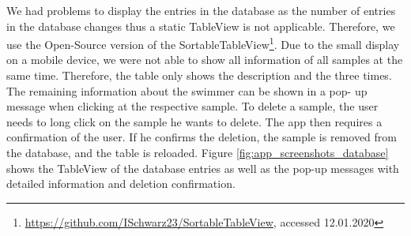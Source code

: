 We had problems to display the entries in the database as the number of entries in the database changes thus a static TableView is not applicable. Therefore, we use the Open-Source version of the SortableTableView\footnote{\url{https://github.com/ISchwarz23/SortableTableView}, accessed 12.01.2020}. Due to the small display on a mobile device, we were not able to show all information of all samples at the same time. Therefore, the table only shows the description and the three times. The remaining information about the swimmer can be shown in a pop- up message when clicking at the respective sample. To delete a sample, the user needs to long click on the sample he wants to delete. The app then requires a confirmation of the user. If he confirms the deletion, the sample is removed from the database, and the table is reloaded. Figure \ref{fig:app_screenshots_database} shows the TableView of the database entries as well as the pop-up messages with detailed information and deletion confirmation.
